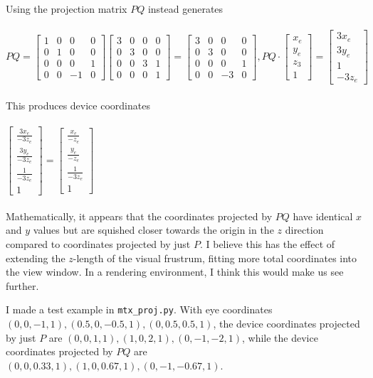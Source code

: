 \documentclass[letterpaper, 11pt]{article}
\begin{document}
Using the projection matrix $PQ$ instead generates \\ \\ 
$PQ = \begin{bmatrix}
1 & 0 & 0 & 0 \\
0 & 1 & 0 & 0 \\
0 & 0 & 0 & 1 \\
0 & 0 & -1 & 0
\end{bmatrix} 
\begin{bmatrix}
3 & 0 & 0 & 0 \\
0 & 3 & 0 & 0 \\
0 & 0 & 3 & 1 \\
0 & 0 & 0 & 1
\end{bmatrix}
=
\begin{bmatrix}
3 & 0 & 0 & 0 \\
0 & 3 & 0 & 0 \\
0 & 0 & 0 & 1 \\
0 & 0 & -3 & 0
\end{bmatrix},
PQ \cdot 
\begin{bmatrix}
x_e  \\
y_e  \\
z_3  \\
1 
\end{bmatrix}
=
\begin{bmatrix}
3x_e  \\
3y_e  \\
1  \\
-3z_e 
\end{bmatrix}$ \\ \\ 


\noindent This produces device coordinates \\ \\ 
$\begin{bmatrix}
\frac{3x_e}{-3z_e}  \\
\frac{3y_e}{-3z_e}  \\
\frac{1}{-3z_e} \\
1
\end{bmatrix}
=
\begin{bmatrix}
\frac{x_e}{-z_e}  \\
\frac{y_e}{-z_e}  \\
\frac{1}{-3z_e} \\
1
\end{bmatrix}$ \\ \\ 

Mathematically, it appears that the coordinates projected by $PQ$ have identical $x$ and $y$ values but are squished closer towards the origin in the $z$ direction compared to coordinates projected by just $P$. I believe this has the effect of extending the $z$-length of the visual frustrum, fitting more total coordinates into the view window. In a rendering environment, I think this would make us see further.

\medskip
I made a test example in \texttt{mtx\_proj.py}. With eye coordinates $(0, 0,-1, 1), (0.5, 0, -0.5, 1), (0, 0.5, 0.5, 1)$, the device coordinates projected by just $P$ are $(0, 0, 1, 1), (1, 0, 2, 1), (0, -1, -2, 1)$, while the device coordinates projected by $PQ$ are $(0, 0, 0.33, 1), (1, 0, 0.67, 1), (0, -1, -0.67, 1)$. 
\end{document}

